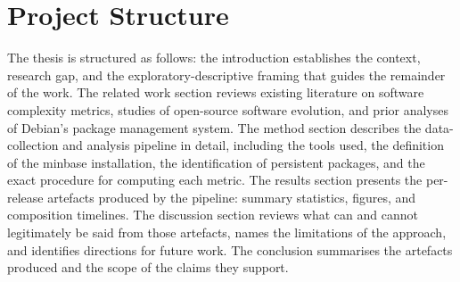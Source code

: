 \section*{Project Structure}
The thesis is structured as follows: the introduction establishes the context, research gap, and the exploratory-descriptive framing that guides the remainder of the work. The related work section reviews existing literature on software complexity metrics, studies of open-source software evolution, and prior analyses of Debian's package management system. The method section describes the data-collection and analysis pipeline in detail, including the tools used, the definition of the minbase installation, the identification of persistent packages, and the exact procedure for computing each metric. The results section presents the per-release artefacts produced by the pipeline: summary statistics, figures, and composition timelines. The discussion section reviews what can and cannot legitimately be said from those artefacts, names the limitations of the approach, and identifies directions for future work. The conclusion summarises the artefacts produced and the scope of the claims they support.